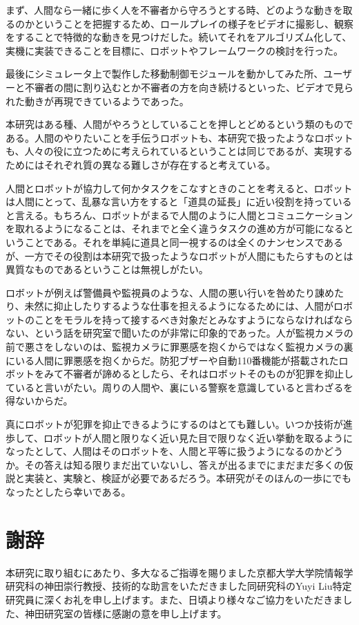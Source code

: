 \documentclass{kuisthesis}
\begin{document}
まず、人間なら一緒に歩く人を不審者から守ろうとする時、どのような動きを取るのかということを把握するため、ロールプレイの様子をビデオに撮影し、観察をすることで特徴的な動きを見つけだした。続いてそれをアルゴリズム化して、実機に実装できることを目標に、ロボットやフレームワークの検討を行った。

最後にシミュレータ上で製作した移動制御モジュールを動かしてみた所、ユーザーと不審者の間に割り込むとか不審者の方を向き続けるといった、ビデオで見られた動きが再現できているようであった。

本研究はある種、人間がやろうとしていることを押しとどめるという類のものである。人間のやりたいことを手伝うロボットも、本研究で扱ったようなロボットも、人々の役に立つために考えられているということは同じであるが、実現するためにはそれぞれ質の異なる難しさが存在すると考えている。

人間とロボットが協力して何かタスクをこなすときのことを考えると、ロボットは人間にとって、乱暴な言い方をすると「道具の延長」に近い役割を持っていると言える。もちろん、ロボットがまるで人間のように人間とコミュニケーションを取れるようになることは、それまでと全く違うタスクの進め方が可能になるということである。それを単純に道具と同一視するのは全くのナンセンスであるが、一方でその役割は本研究で扱ったようなロボットが人間にもたらすものとは異質なものであるということは無視しがたい。

ロボットが例えば警備員や監視員のような、人間の悪い行いを咎めたり諌めたり、未然に抑止したりするような仕事を担えるようになるためには、人間がロボットのことをモラルを持って接するべき対象だとみなすようにならなければならない、という話を研究室で聞いたのが非常に印象的であった。人が監視カメラの前で悪さをしないのは、監視カメラに罪悪感を抱くからではなく監視カメラの裏にいる人間に罪悪感を抱くからだ。防犯ブザーや自動110番機能が搭載されたロボットをみて不審者が諦めるとしたら、それはロボットそのものが犯罪を抑止していると言いがたい。周りの人間や、裏にいる警察を意識していると言わざるを得ないからだ。

真にロボットが犯罪を抑止できるようにするのはとても難しい。いつか技術が進歩して、ロボットが人間と限りなく近い見た目で限りなく近い挙動を取るようになったとして、人間はそのロボットを、人間と平等に扱うようになるのかどうか。その答えは知る限りまだ出ていないし、答えが出るまでにまだまだ多くの仮説と実装と、実験と、検証が必要であるだろう。本研究がそのほんの一歩にでもなったとしたら幸いである。

\section{謝辞}
本研究に取り組むにあたり、多大なるご指導を賜りました京都大学大学院情報学研究科の神田崇行教授、技術的な助言をいただきました同研究科のYuyi Liu特定研究員に深くお礼を申し上げます。また、日頃より様々なご協力をいただきました、神田研究室の皆様に感謝の意を申し上げます。
\end{document}
